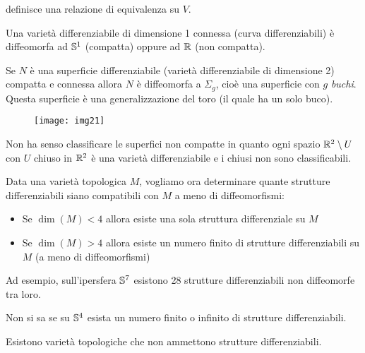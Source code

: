 definisce una relazione di equivalenza su $ V $.

\begin{theorem}
	Una varietà differenziabile di dimensione 1 connessa (curva differenziabili) è diffeomorfa ad $ \S^{1} $ (compatta) oppure ad $ \R $ (non compatta).
\end{theorem}

\begin{theorem}
	Se $ N $ è una superficie differenziabile (varietà differenziabile di dimensione 2) compatta e connessa allora $ N $ è diffeomorfa a $ \Sigma_{g} $, cioè una superficie con $ g $ \textit{buchi}. Questa superficie è una generalizzazione del toro (il quale ha un solo buco).
	
	\begin{figure}[H]
		\centering
		\texttt{[image: img21]}
	\end{figure}
\end{theorem}

\begin{remark}
	Non ha senso classificare le superfici non compatte in quanto ogni spazio $ \R^{2} \setminus U $ con $ U $ chiuso in $ \R^{2} $ è una varietà differenziabile e i chiusi non sono classificabili.
\end{remark}

Data una varietà topologica $ M $, vogliamo ora determinare quante strutture differenziabili siano compatibili con $ M $ a meno di diffeomorfismi:

\begin{itemize}
	\item Se $ \dim(M) < 4 $ allora esiste una sola struttura differenziale su $ M $
	
	\item Se $ \dim(M) > 4 $ allora esiste un numero finito di strutture differenziabili su $ M $ (a meno di diffeomorfismi)
\end{itemize}

Ad esempio, sull'ipersfera $ \S^{7} $ esistono 28 strutture differenziabili non diffeomorfe tra loro.

\begin{remark}
	Non si sa se su $ \S^{4} $ esista un numero finito o infinito di strutture differenziabili.
\end{remark}

\begin{remark}
	Esistono varietà topologiche che non ammettono strutture differenziabili.
\end{remark}

